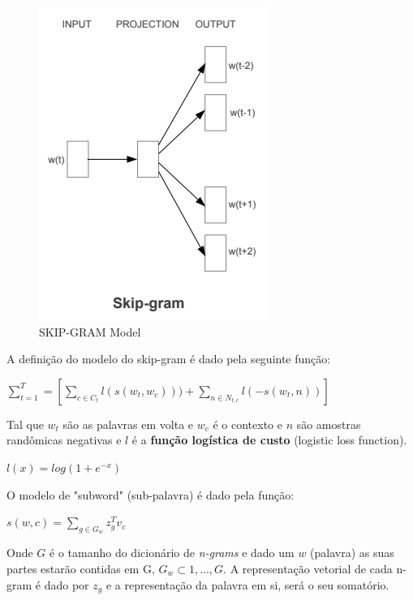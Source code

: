 \begin{figure}[]
	\caption{\label{skip_gram_model} SKIP-GRAM Model}
	\begin{center}
	    \includegraphics[scale=0.5]{artigo/recursos/imagens/skip_gram_model.png}
	\end{center}
\end{figure}

A definição do modelo do skip-gram é dado pela seguinte função:

\begin{center}\large
    $\sum_{t=1}^{T} = \left [ \sum_{c \in C_t} l(s(w_t, w_c))) + \sum_{n \in N_{t,c}} l(-s(w_t, n)) \right ]$
\end{center}

Tal que $w_t$ são as palavras em volta e $w_c$ é o contexto e $n$ são amostras randômicas negativas e $l$ é a \textbf{função logística de custo} (logistic loss function).

\begin{center}\large
    $l(x) = log(1 + e^{-x})$
\end{center}

O modelo de "subword" (sub-palavra) é dado pela função:

\begin{center}\large
    $s(w, c) = \sum_{g \in G_w} z_{g}^{T} v_c$
\end{center}

Onde $G$ é o tamanho do dicionário de \textit{n-grams} e dado um $w$ (palavra) as suas partes estarão contidas em G, $G_w \subset {1, ..., G}$. A representação vetorial de cada n-gram é dado por $z_g$ e a representação da palavra em si, será o seu somatório.

